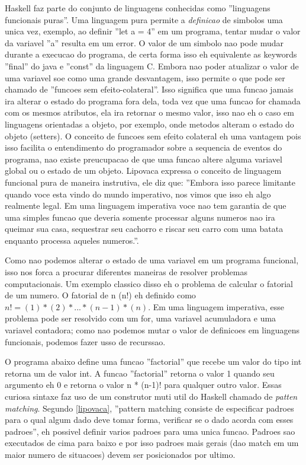 Haskell faz parte do conjunto de linguagens conhecidas como ''linguagens funcionais puras''.
Uma linguagem pura permite a \emph{definicao} de simbolos uma unica vez, exemplo, ao definir ''let a = 4'' em um programa, tentar mudar o valor da variavel ''a'' resulta em um error.
O valor de um simbolo nao pode mudar durante a execucao do programa, de certa forma isso eh equivalente as keywords ''final'' do java e ''const'' da linguagem C.
Embora nao poder atualizar o valor de uma variavel soe como uma grande desvantagem, isso permite o que pode ser chamado de ''funcoes sem efeito-colateral''.
Isso significa que uma funcao jamais ira alterar o estado do programa fora dela, toda vez que uma funcao for chamada com os mesmos atributos, ela ira retornar o mesmo valor, isso nao eh o caso em linguagens orientadas a objeto, por exemplo, onde metodos alteram o estado do objeto (setters).
O conceito de funcoes sem efeito colateral eh uma vantagem pois isso facilita o entendimento do programador sobre a sequencia de eventos do programa, nao existe preucupacao de que uma funcao altere alguma variavel global ou o estado de um objeto.
Lipovaca expressa o conceito de linguagem funcional pura de maneira instrutiva, ele diz que:
''Embora isso parece limitante quando voce esta vindo do mundo imperativo, nos vimos que isso eh algo realmente legal. Em uma linguagem imperativa voce nao tem garantia de que uma simples funcao que deveria somente processar alguns numeros nao ira queimar sua casa, sequestrar seu cachorro e riscar seu carro com uma batata enquanto processa aqueles numeros.''.

Como nao podemos alterar o estado de uma variavel em um programa funcional, isso nos forca a procurar diferentes maneiras de resolver problemas computacionais.
Um exemplo classico disso eh o problema de calcular o fatorial de um numero.
O fatorial de n (n!) eh definido como $ n! = (1)*(2)*...*(n-1)*(n)$.
Em uma linguagem imperativa, esse problema pode ser resolvido com um for, uma variavel acumuladora e uma variavel contadora; como nao podemos mutar o valor de definicoes em linguagens funcionais, podemos fazer usso de recurssao.

O programa abaixo define uma funcao ''factorial'' que recebe um valor do tipo int retorna um de valor int.
A funcao ''factorial'' retorna o valor 1 quando seu argumento eh 0 e retorna o valor n * (n-1)! para qualquer outro valor.
Essas curiosa sintaxe faz uso de um construtor muti util do Haskell chamado de \emph{patten matching}.
Segundo \ref{lipovaca}, ''pattern matching consiste de especificar padroes para o qual algum dado deve tomar forma, verificar se o dado acorda com esses padroes'', eh possivel definir varios padroes para uma unica funcao.
Padroes sao executados de cima para baixo e por isso padroes mais gerais (dao match em um maior numero de situacoes) devem ser posicionados por ultimo.


